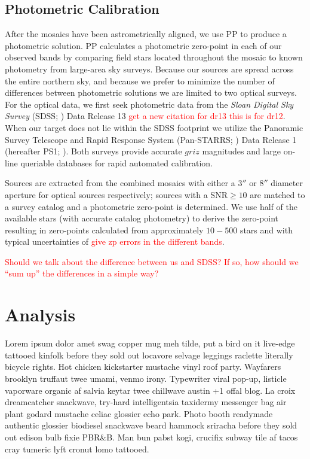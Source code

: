 \documentclass[apj, revtex4]{emulateapj}
\newcommand{\editorial}[1]{\textcolor{red}{#1}}
\begin{document}
\subsection{Photometric Calibration}
After the mosaics have been astrometrically aligned, we use PP to produce a photometric solution. PP calculates a photometric zero-point in each of our observed bands by comparing field stars located throughout the mosaic to known photometry from large-area sky surveys. Because our sources are spread across the entire northern sky, and because we prefer to minimize the number of differences between photometric solutions we are limited to two optical surveys. For the optical data, we first seek photometric data from the \textit{Sloan Digital Sky Survey} (SDSS; \citealt{York2000}) Data Release 13 \citep{Alam2015} \editorial{get a new citation for dr13 this is for dr12}. When our target does not lie within the SDSS footprint we utilize the Panoramic Survey Telescope and Rapid Response System (Pan-STARRS; \citealt{Chambers2016}) Data Release 1 (hereafter PS1; \citealt{Flewelling2016}). Both surveys provide accurate $griz$ magnitudes and large on-line queriable databases for rapid automated calibration.

Sources are extracted from the combined mosaics with either a $3''$ or $8''$ diameter aperture for optical sources respectively; sources with a SNR$\ge10$ are matched to a survey catalog and a photometric zero-point is determined. We use half of the available stars (with accurate catalog photometry) to derive the zero-point resulting in zero-points calculated from approximately $10-500$ stars and with typical uncertainties of \editorial{give zp errors in the different bands}.

\editorial{Should we talk about the difference between us and SDSS? If so, how should we ``sum up'' the differences in a simple way?} 

\section{Analysis}\label{sec:analysis}
Lorem ipsum dolor amet swag copper mug meh tilde, put a bird on it live-edge tattooed kinfolk before they sold out locavore selvage leggings raclette literally bicycle rights. Hot chicken kickstarter mustache vinyl roof party. Wayfarers brooklyn truffaut twee umami, venmo irony. Typewriter viral pop-up, listicle vaporware organic af salvia keytar twee chillwave austin +1 offal blog. La croix dreamcatcher snackwave, try-hard intelligentsia taxidermy messenger bag air plant godard mustache celiac glossier echo park. Photo booth readymade authentic glossier biodiesel snackwave beard hammock sriracha before they sold out edison bulb fixie PBR\&B. Man bun pabst kogi, crucifix subway tile af tacos cray tumeric lyft cronut lomo tattooed.
\end{document}
